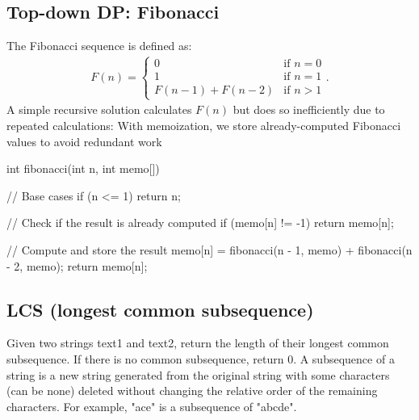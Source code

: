\documentclass{report}
\begin{document}
\subsection{Top-down DP: Fibonacci}
\bigbreak \noindent 
The Fibonacci sequence is defined as:
\begin{align*}
    F(n) = \begin{cases}
        0 & \text{if } n = 0 \\    
        1 & \text{if } n = 1    \\ 
        F(n-1) + F(n-2) &\text{if } n > 1
    \end{cases}
.\end{align*}
\bigbreak \noindent 
A simple recursive solution calculates $F(n)$ but does so inefficiently due to repeated calculations:
\bigbreak \noindent 
With memoization, we store already-computed Fibonacci values to avoid redundant work
\bigbreak \noindent 
\begin{cppcode}
    int fibonacci(int n, int memo[]) {
        // Base cases
        if (n <= 1) return n;

        // Check if the result is already computed
        if (memo[n] != -1) return memo[n];

        // Compute and store the result
        memo[n] = fibonacci(n - 1, memo) + fibonacci(n - 2, memo);
        return memo[n];
    }
\end{cppcode}

\pagebreak 
{}
\bigbreak \noindent 
\subsection{LCS (longest common subsequence)}
\bigbreak \noindent 
Given two strings text1 and text2, return the length of their longest common subsequence. If there is no common subsequence, return 0.
\bigbreak \noindent 
A subsequence of a string is a new string generated from the original string with some characters (can be none) deleted without changing the relative order of the remaining characters.
\bigbreak \noindent 
For example, "ace" is a subsequence of "abcde".




\pagebreak 
{}
\bigbreak \noindent 
\end{document}
